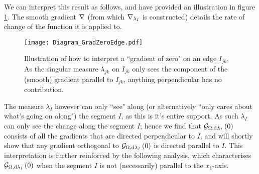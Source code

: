 We can interpret this result as follows, and have provided an illustration in figure \ref{fig:GradZeroEdge}.
The smooth gradient $\nabla$ (from which $\nabla_{\lambda_I}$ is constructed) details the rate of change of the function it is applied to.
\begin{figure}[b]
	\centering
	\texttt{[image: Diagram\_GradZeroEdge.pdf]}
	\caption{\label{fig:GradZeroEdge} Illustration of how to interpret a ``gradient of zero" on an edge $I_{jk}$. As the singular measure $\lambda_{jk}$ on $I_{jk}$ only sees the component of the (smooth) gradient parallel to $I_{jk}$, anything perpendicular has no contribution.}
\end{figure}
The measure $\lambda_I$ however can only ``see" along (or alternatively ``only cares about what's going on along") the segment $I$, as this is it's entire support.
As such $\lambda_I$ can only see the change along the segment $I$; hence we find that $\mathcal{G}_{ \Omega, \mathrm{d}\lambda_I}\left( 0 \right)$ consists of all the gradients that are directed perpendicular to $I$, and will shortly show that any gradient orthogonal to $\mathcal{G}_{ \Omega, \mathrm{d}\lambda_I}\left( 0 \right)$ is directed parallel to $I$.
This interpretation is further reinforced by the following analysis, which characterises $\mathcal{G}_{ \Omega, \mathrm{d}\lambda_I}\left( 0 \right)$ when the segment $I$ is not (necessarily) parallel to the $x_1$-axis. \newline

